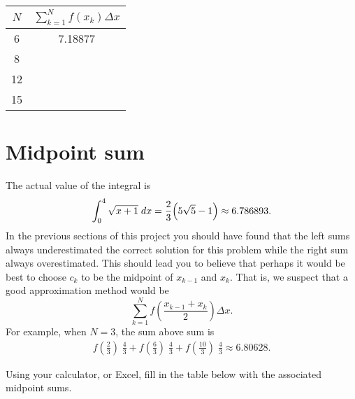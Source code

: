 \begin{center}
  \begin{tabular}{cc}
    \toprule
    \rule[-8pt]{0pt}{14pt}
    $N$ & $\sum_{k = 1}^{N} f(x_{k})\Delta x$\\
    \toprule
    6 & 7.18877 \\ \midrule
    8 & \\ \midrule
    12 & \\ \midrule
    15 & \\ \bottomrule
  \end{tabular}
\end{center}




\section{Midpoint sum}

The actual value of the integral is
\begin{equation}
  \label{eq:exact-value}
  \int_0^4 \sqrt{x+1} \;  dx = \frac{2} {3}\Bigl(5\sqrt{5} - 1\Bigr) \approx 6.786893.
\end{equation}
In the previous sections of this project you should have found that the left
sums always underestimated the correct solution for this problem while the right
sum always overestimated.  This should lead you to believe that perhaps it would
be best to choose $c_k$ to be the midpoint of $x_{k-1}$ and $x_{k}$.  That is, we
suspect that a good approximation method would be
\[
\sum_{k = 1}^{N} f\left(\frac{x_{k-1} + x_k}{2}\right) \Delta x.
\]
For example, when $N = 3$, the sum above sum is
\begin{align*}
  f({\tfrac{2}{3}}) \; \tfrac{4}{3} + f({\tfrac{6}{3}})\; \tfrac{4}{3} +
  f({\tfrac{10}{3}})\; \tfrac{4}{3} \approx 6.80628.
\end{align*}

Using your calculator, or Excel, fill in the table below with the associated
midpoint sums.


